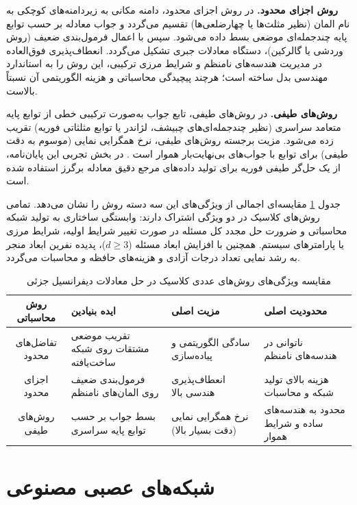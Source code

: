 \textbf{روش اجزای محدود.} در روش اجزای محدود، دامنه مکانی به زیردامنه‌های کوچکی به نام المان (نظیر مثلث‌ها یا چهارضلعی‌ها) تقسیم می‌گردد و جواب معادله بر حسب توابع پایه چندجمله‌ای موضعی بسط داده می‌شود. سپس با اعمال فرمول‌بندی ضعیف (روش وردشی یا گالرکین)، دستگاه معادلات جبری تشکیل می‌گردد. انعطاف‌پذیری فوق‌العاده در مدیریت هندسه‌های نامنظم و شرایط مرزی ترکیبی، این روش را به استاندارد مهندسی بدل ساخته است؛ هرچند پیچیدگی محاسباتی و هزینه الگوریتمی آن نسبتاً بالاست.

\textbf{روش‌های طیفی.} در روش‌های طیفی، تابع جواب به‌صورت ترکیبی خطی از توابع پایه متعامد سراسری (نظیر چندجمله‌ای‌های چبیشف، لژاندر یا توابع مثلثاتی فوریه) تقریب زده می‌شود. مزیت برجسته روش‌های طیفی، نرخ همگرایی نمایی (موسوم به دقت طیفی) برای توابع با جواب‌های بی‌نهایت‌بار هموار است \cite{trefethen2000}. در بخش تجربی این پایان‌نامه، از یک حل‌گر طیفی فوریه برای تولید داده‌های مرجع دقیق معادله برگرز استفاده شده است.

جدول \ref{tab:numerical} مقایسه‌ای اجمالی از ویژگی‌های این سه دسته روش را نشان می‌دهد. تمامی روش‌های کلاسیک در دو ویژگی اشتراک دارند: وابستگی ساختاری به تولید شبکه محاسباتی و ضرورت حل مجدد کل مسئله در صورت تغییر شرایط اولیه، شرایط مرزی یا پارامترهای سیستم. همچنین با افزایش ابعاد مسئله ($d \ge 3$)، پدیده نفرین ابعاد منجر به رشد نمایی تعداد درجات آزادی و هزینه‌های حافظه و محاسبات می‌گردد.

\begin{table}[t]
\caption{مقایسه ویژگی‌های روش‌های عددی کلاسیک در حل معادلات دیفرانسیل جزئی}
\label{tab:numerical}
\centering
\singlespacing
\begin{tabular}{|c|p{3.3cm}|p{3.3cm}|p{3.3cm}|}
\hline
\textbf{روش محاسباتی} & \textbf{ایده بنیادین} & \textbf{مزیت اصلی} & \textbf{محدودیت اصلی} \\
\hline
تفاضل‌های محدود & تقریب موضعی مشتقات روی شبکه ساخت‌یافته & سادگی الگوریتمی و پیاده‌سازی & ناتوانی در هندسه‌های نامنظم \\
\hline
اجزای محدود & فرمول‌بندی ضعیف روی المان‌های نامنظم & انعطاف‌پذیری هندسی بالا & هزینه بالای تولید شبکه و محاسبات \\
\hline
روش‌های طیفی & بسط جواب بر حسب توابع پایه سراسری & نرخ همگرایی نمایی (دقت بسیار بالا) & محدود به هندسه‌های ساده و شرایط هموار \\
\hline
\end{tabular}
\end{table}

\section{شبکه‌های عصبی مصنوعی}
\label{sec:ann}

